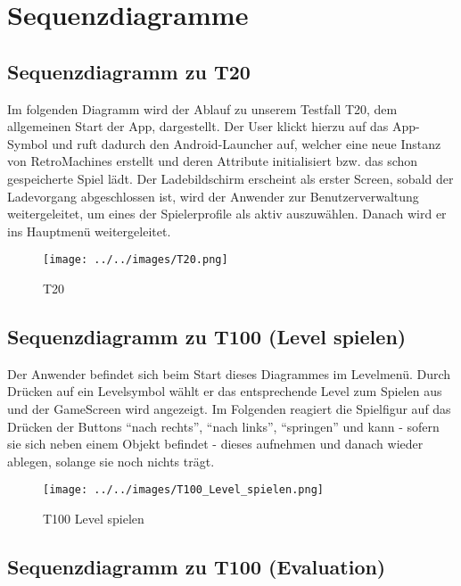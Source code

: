 \clearpage

\chapter{Sequenzdiagramme}

\section{Sequenzdiagramm  zu T20}

Im folgenden Diagramm wird der Ablauf zu unserem Testfall T20, dem allgemeinen Start der App, dargestellt. Der User klickt hierzu auf das App-Symbol und ruft dadurch den Android-Launcher auf, welcher eine neue Instanz von RetroMachines erstellt und deren Attribute initialisiert bzw. das schon gespeicherte Spiel lädt. Der Ladebildschirm erscheint als erster Screen, sobald der Ladevorgang abgeschlossen ist, wird der Anwender zur Benutzerverwaltung weitergeleitet, um eines der Spielerprofile als aktiv auszuwählen. Danach wird er ins Hauptmenü weitergeleitet.

\begin{figure}[!htb]
	\centering
	\texttt{[image: ../../images/T20.png]}
	\caption{T20}
	\label{fig:t100evluation}
\end{figure}

\section{Sequenzdiagramm zu T100 (Level spielen)}

Der Anwender befindet sich beim Start dieses Diagrammes im Levelmenü. Durch Drücken auf ein Levelsymbol wählt er das entsprechende Level zum Spielen aus und der GameScreen wird angezeigt. Im Folgenden reagiert die Spielfigur auf das Drücken der Buttons \enquote{nach rechts}, \enquote{nach links}, \enquote{springen} und kann - sofern sie sich neben einem Objekt befindet - dieses aufnehmen und danach wieder ablegen, solange sie noch nichts trägt.

\begin{figure}[!htb]
    \centering
    \texttt{[image: ../../images/T100\_Level\_spielen.png]}
    \caption{T100 Level spielen}
    \label{fig:t100evluation}
\end{figure}


\section{Sequenzdiagramm zu T100 (Evaluation)}


